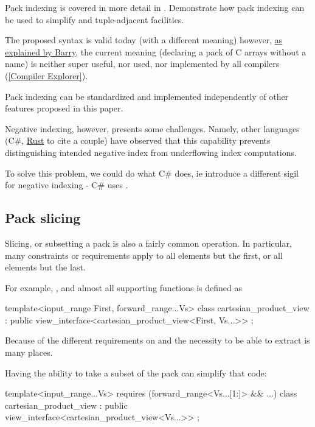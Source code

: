 \documentclass{wg21}
\begin{document}
Pack indexing is covered in more detail in .  Demonstrate how pack indexing can be used to simplify
 and tuple-adjacent facilities.

The proposed syntax is valid today (with a different meaning) however, \href{https://www.open-std.org/jtc1/sc22/wg21/docs/papers/2020/p1858r2.html#pack-indexing-ambiguity}{as explained by Barry},
the current meaning (declaring a pack of C arrays without a name) is neither super useful, nor used, nor implemented by all compilers (\href{https://godbolt.org/z/6obhffPTP}{[Compiler Explorer]}).

Pack indexing can be standardized and implemented independently of other features proposed in this paper.

Negative indexing, however, presents some challenges.
Namely, other languages (C\#, \href{https://github.com/rust-lang/rfcs/issues/2249#issuecomment-352128826}{Rust} to cite a couple) have observed that this capability prevents distinguishing intended negative index from underflowing index computations.

To solve this problem, we could do what C\# does, ie introduce a different sigil for negative indexing - C\# uses \tcode{\caret}.

\subsection{Pack slicing}
\label{sec:packslicing}

Slicing, or subsetting a pack is also a fairly common operation.
In particular, many constraints or requirements apply to all elements but the first, or all elements but the last.

For example, , and almost all supporting functions is defined as

\begin{colorblock}
template<input_range First, forward_range...Vs>
class cartesian_product_view : public view_interface<cartesian_product_view<First, Vs...>> {};
\end{colorblock}

Because of the different requirements on  and the necessity to be able to extract 
is many places.

Having the ability to take a subset of the pack can simplify that code:

\begin{colorblock}
template<input_range...Vs>
requires (forward_range<Vs...[1:]> && ...)
class cartesian_product_view : public view_interface<cartesian_product_view<Vs...>> {};
\end{colorblock}
\end{document}
